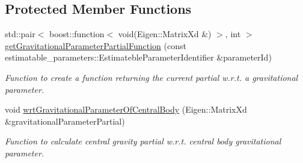 \subsection*{Protected Member Functions}
\begin{DoxyCompactItemize}
\item 
std\+::pair$<$ boost\+::function$<$ void(Eigen\+::\+Matrix\+Xd \&) $>$, int $>$ \hyperlink{classtudat_1_1acceleration__partials_1_1CentralGravitationPartial_a153d189d25717713fe37986fc16cf372}{get\+Gravitational\+Parameter\+Partial\+Function} (const estimatable\+\_\+parameters\+::\+Estimateble\+Parameter\+Identifier \&parameter\+Id)
\begin{DoxyCompactList}\small\item\em Function to create a function returning the current partial w.\+r.\+t. a gravitational parameter. \end{DoxyCompactList}\item 
void \hyperlink{classtudat_1_1acceleration__partials_1_1CentralGravitationPartial_a9a5af1a5795d75c054b6edff0878149d}{wrt\+Gravitational\+Parameter\+Of\+Central\+Body} (Eigen\+::\+Matrix\+Xd \&gravitational\+Parameter\+Partial)\hypertarget{classtudat_1_1acceleration__partials_1_1CentralGravitationPartial_a9a5af1a5795d75c054b6edff0878149d}{}\label{classtudat_1_1acceleration__partials_1_1CentralGravitationPartial_a9a5af1a5795d75c054b6edff0878149d}

\begin{DoxyCompactList}\small\item\em Function to calculate central gravity partial w.\+r.\+t. central body gravitational parameter. \end{DoxyCompactList}\end{DoxyCompactItemize}
